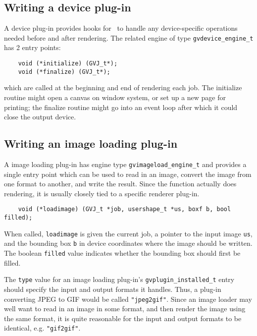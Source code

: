 \subsection{Writing a device plug-in}
\label{sec:device}

A device plug-in provides hooks for \gviz\ to handle any
device-specific operations needed before and after rendering.
The related engine of type {\tt gvdevice\_engine\_t} has 2 entry points:
\begin{verbatim}
    void (*initialize) (GVJ_t*);
    void (*finalize) (GVJ_t*);
\end{verbatim}
which are called at the beginning and end of rendering each job.
The initialize routine might open a canvas on window system, or
set up a new page for printing;
the finalize routine might go into an event loop after which it could close
the output device.

\subsection{Writing an image loading plug-in}
\label{sec:imageload}

A image loading plug-in has engine type
{\tt gvimageload\_engine\_t} and provides a single entry point which can be
used to read in an image,
convert the image from one format to another, and write the result.
Since the function actually does rendering, it is usually closely tied
to a specific renderer plug-in.
\begin{verbatim}
    void (*loadimage) (GVJ_t *job, usershape_t *us, boxf b, bool filled);
\end{verbatim}
When called, {\tt loadimage} is given the current job, a pointer to the
input image {\tt us}, and the bounding box {\tt b} in device coordinates
where the image should be written. The boolean {\tt filled} value indicates
whether the bounding box should first be filled.

The {\tt type} value for an image loading plug-in's 
{\tt gvplugin\_installed\_t} entry should specify the input and output
formats it handles. Thus, a plug-in converting JPEG to GIF would be
called {\tt "jpeg2gif"}. Since an image loader may well want to read in
an image in some format, and then render the image using the same format,
it is quite reasonable for the input and output formats to be identical,
e.g. {\tt "gif2gif"}.

